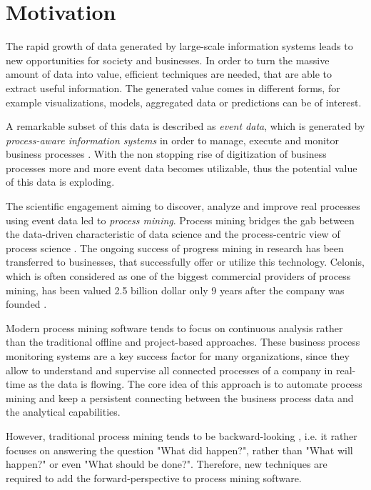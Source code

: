 
\section{Motivation}

The rapid growth of data generated by large-scale information systems leads to new opportunities for  society and businesses.
In order to turn the massive amount of data into value, efficient techniques are needed, that are able to extract useful information.
The generated value comes in different forms, for example visualizations, models, aggregated data or predictions can be of interest. 

A remarkable subset of this data is described as \textit{event data}, which is generated by \textit{process-aware information systems} in order to manage, execute and monitor business processes \cite{DBLP:journals/topnoc/Aalst09}.
With the non stopping rise of digitization of business processes more and more event data becomes utilizable, thus the potential value of this data is exploding.

The scientific engagement aiming to discover, analyze and improve real processes using event data led to \textit{process mining}. Process mining bridges the gab between the data-driven characteristic of data science and the process-centric view of process science \cite{DBLP:books/sp/Aalst16}.
The ongoing success of progress mining in research has been transferred to businesses, that successfully offer or utilize this technology.
Celonis, which is often considered as one of the biggest commercial providers of process mining, has been valued 2.5 billion dollar only 9 years after the company was founded \cite{celonis}.

Modern process mining software tends to focus on continuous analysis rather than the traditional offline and project-based approaches.
These business process monitoring systems are a key success factor for many organizations, since they allow to understand and supervise all connected processes of a company in real-time as the data is flowing.
The core idea of this approach is to automate process mining and keep a persistent connecting between the business process data and the analytical capabilities.

However, traditional process mining tends to be backward-looking  \cite{DBLP:conf/scsc/Aalst18}, i.e. it rather focuses on answering the question "What did happen?", rather than "What will happen?" or even "What should be done?".
Therefore, new techniques are required to add the forward-perspective to process mining software.

